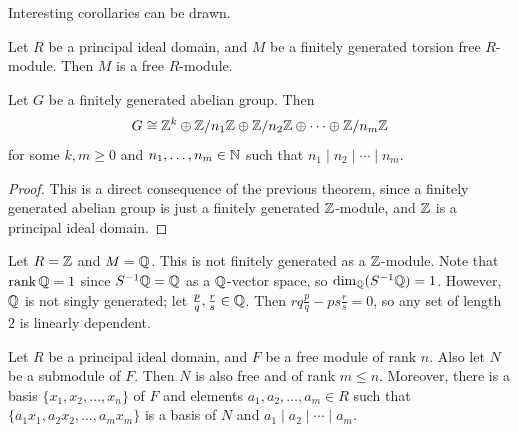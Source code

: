 Interesting corollaries can be drawn.

\begin{corollary}
    Let $R$ be a principal ideal domain, and $M$ be a finitely generated torsion free $R$-module. Then $M$ is a free $R$-module.
\end{corollary}

\begin{theorem}
    Let $G$ be a finitely generated abelian group. Then
    \begin{align}
        G \cong \mathbb{Z}^{k} \oplus \mathbb{Z}/n_{1}\mathbb{Z} \oplus \mathbb{Z}/n_{2}\mathbb{Z} \oplus \cdots \oplus \mathbb{Z}/n_{m}\mathbb{Z}
    \end{align}
    for some $k,m \geq 0$ and $n_{1},\ldots,n_{m} \in \mathbb{N}$ such that $n_{1} \mid n_{2} \mid \cdots \mid n_{m}$.
\end{theorem}
\begin{proof}
    This is a direct consequence of the previous theorem, since a finitely generated abelian group is just a finitely generated $\mathbb{Z}$-module, and $\mathbb{Z}$ is a principal ideal domain.
\end{proof}

\begin{example}
    Let $R = \mathbb{Z}$ and $M = \mathbb{Q}$. This is not finitely generated as a $\mathbb{Z}$-module. Note that $\operatorname{rank} \mathbb{Q} = 1$ since $S^{-1}\mathbb{Q} = \mathbb{Q}$ as a $\mathbb{Q}$-vector space, so $\dim_{\mathbb{Q}}(S^{-1}\mathbb{Q}) = 1$. However, $\mathbb{Q}$ is not singly generated; let $\frac{p}{q},\frac{r}{s} \in \mathbb{Q}$. Then $rq\frac{p}{q} -ps\frac{r}{s} = 0$, so any set of length $2$ is linearly dependent.
\end{example}

\begin{proposition}
    Let $R$ be a principal ideal domain, and $F$ be a free module of rank $n$. Also let $N$ be a submodule of $F$. Then $N$ is also free and of rank $m \leq n$. Moreover, there is a basis $\{x_{1},x_{2},\ldots,x_{n}\}$ of $F$ and elements $a_{1},a_{2},\ldots,a_{m} \in R$ such that $\{a_{1}x_{1},a_{2}x_{2},\ldots,a_{m}x_{m}\}$ is a basis of $N$ and $a_{1} \mid a_{2} \mid \cdots \mid a_{m}$.
\end{proposition}

